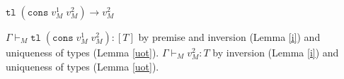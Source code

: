 \begin{case}
$\mathtt{tl}\;(\mathtt{cons}\;v_{M}^{1}\;v_{M}^{2})\rightarrow v_{M}^{2}$

$\Gamma\vdash_{M}\mathtt{tl}\;(\mathtt{cons}\;v_{M}^{1}\;v_{M}^{2}):[T]$ by premise and inversion (Lemma \ref{i}) and uniqueness of types (Lemma \ref{uot}).  $\Gamma\vdash_{M}v_{M}^{2}:T$ by inversion (Lemma \ref{i}) and uniqueness of types (Lemma \ref{uot}).
\end{case}
